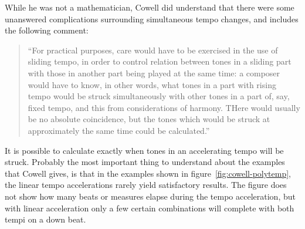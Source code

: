 While he was not a mathematician, Cowell did understand that there
were some unanswered complications surrounding simultaneous tempo
changes, and includes the following comment:
\begin{quotation}
``For practical purposes, care would have to be exercised in the use of
sliding tempo, in order to control relation between tones in a sliding
part with those in another part being played at the same time: a
composer would have to know, in other words, what tones in a part with
rising tempo would be struck simultaneously with other tones in a part
of, say, fixed tempo, and this from considerations of harmony. THere
would usually be no absolute coincidence, but the tones which would be
struck at approximately the same time could be calculated.''
\end{quotation}
It is possible to calculate exactly when tones in an accelerating
tempo will be struck. Probably the most important thing to understand
about the examples that Cowell gives, is that in the examples shown in
figure~\ref{fig:cowell-polytemp}, the linear tempo accelerations
rarely yield satisfactory results. The figure does not show how many
beats or measures elapse during the tempo acceleration, but with
linear acceleration only a few certain combinations will complete with
both tempi on a down beat.

